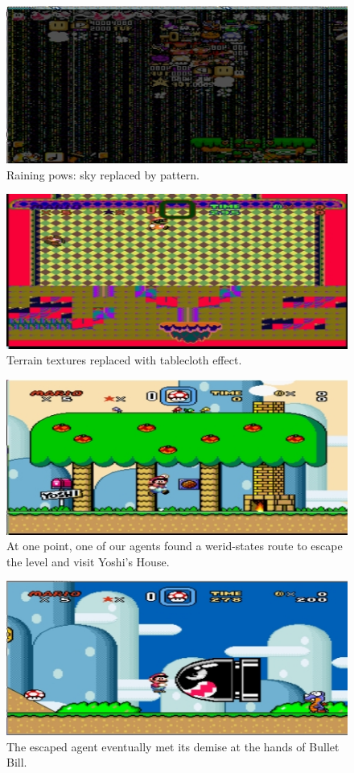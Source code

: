 \documentclass[]{article}
\begin{document}
\begin{figure}
\centering
\includegraphics{./img/Tuesday-13-40-25.jpg}
\caption{Raining pows: sky replaced by pattern.}
\end{figure}

\begin{figure}
\centering
\includegraphics{./img/Tuesday-14-32-08.jpg}
\caption{Terrain textures replaced with tablecloth effect.}
\end{figure}

\begin{figure}
\centering
\includegraphics{./img/Tuesday-13-30-11.jpg}
\caption{At one point, one of our agents found a werid-states route to
escape the level and visit Yoshi's House.}
\end{figure}

\begin{figure}
\centering
\includegraphics{./img/Tuesday-13-33-29.jpg}
\caption{The escaped agent eventually met its demise at the hands of
Bullet Bill.}
\end{figure}
\end{document}
